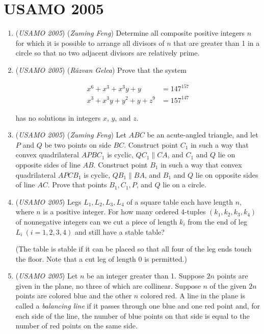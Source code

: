 \section{USAMO 2005}
        \begin{enumerate}
        	\item (\textit{USAMO 2005}) (\textit{Zuming Feng}) Determine all composite positive integers $n$ for which it is possible to arrange all divisors of $n$ that are greater than 1 in a circle so that no two adjacent divisors are relatively prime.


 

	\item (\textit{USAMO 2005}) (\textit{Răzvan Gelca}) Prove that the
system

 \begin{align*} x^6+x^3+x^3y+y & = 147^{157} \\ x^3+x^3y+y^2+y+z^9 & = 157^{147} \end{align*}

has no solutions in integers $x$, $y$, and $z$.


 

	\item (\textit{USAMO 2005}) (\textit{Zuming Feng}) Let $ABC$ be an acute-angled triangle, and let $P$ and $Q$ be two points on side $BC$. Construct point $C_1$ in such a way that convex quadrilateral $APBC_1$ is cyclic, $QC_1 \parallel CA$, and $C_1$ and $Q$ lie on opposite sides of line $AB$. Construct point $B_1$ in such a way that convex quadrilateral $APCB_1$ is cyclic, $QB_1 \parallel BA$, and $B_1$ and $Q$  lie on opposite sides of line $AC$.  Prove that points $B_1, C_1,P$, and $Q$ lie on a circle.


 

	\item (\textit{USAMO 2005}) Legs $L_1,L_2,L_3,L_4$ of a square table each have length $n$, where $n$ is a positive integer. For how many ordered 4-tuples $\left(k_1,k_2,k_3,k_4\right)$ of nonnegative integers can we cut a piece of length $k_i$ from the end of leg $L_i\ (i=1,2,3,4)$ and still have a stable table?


 (The table is stable if it can be placed so that all four of the leg ends touch the floor. Note that a cut leg of length 0 is permitted.)


 

	\item (\textit{USAMO 2005}) Let $n$ be an integer greater than 1. Suppose $2n$ points are given in the plane, no three of which are collinear. Suppose $n$ of the given $2n$ points are colored blue and the other $n$ colored red. A line in the plane is called a \textit{balancing line} if it passes through one blue and one red point and, for each side of the line, the number of blue points on that side is equal to the number of red points on the same side.



\end{enumerate}
